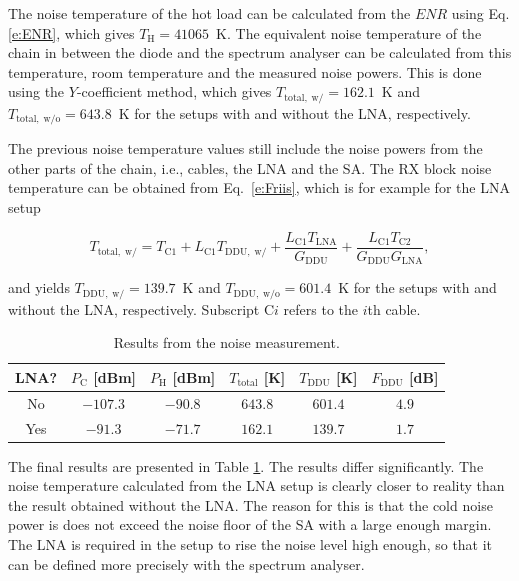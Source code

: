 \documentclass[a4paper, 12pt]{article}
\begin{document}
The noise temperature of the hot load can be calculated from the $\mathit{ENR}$ using Eq. \ref{e:ENR}, which 
gives $T_\mathrm{H} = 41065$~K. The equivalent noise temperature of the chain in between the diode and 
the spectrum analyser can be calculated from this temperature, room temperature and the measured 
noise powers. This is done using the $Y$-coefficient method, which gives $T_{\mathrm{total,\;w/}} = 162.1$~K 
and $T_{\mathrm{total,\;w/o}} = 643.8$~K for the setups with and without the LNA, respectively.

The previous noise temperature values still include the noise powers from the other parts of the 
chain, i.e., cables, the LNA and the SA. The RX block noise temperature can be obtained from Eq.~\ref{e:Friis},
which is for example for the LNA setup

\begin{equation}
T_\mathrm{total,\;w/} = T_\mathrm{C1} + L_\mathrm{C1} T_\mathrm{DDU,\;w/} + \frac{L_\mathrm{C1} T_\mathrm{LNA}}{G_\mathrm{DDU}} + \frac{L_\mathrm{C1} T_\mathrm{C2}}{G_\mathrm{DDU} G_\mathrm{LNA}},
\end{equation}

\noindent
and yields $T_{\mathrm{DDU,\;w/}} = 139.7$~K and $T_{\mathrm{DDU,\;w/o}} = 601.4$~K for the setups 
with and without the LNA, respectively. Subscript $\mathrm{C}i$ refers to the $i$th cable.

\begin{table}[!h]
	\begin{center}
	\caption{Results from the noise measurement.}
	\label{t:noise}
	\renewcommand*{\arraystretch}{1.2}
	\begin{tabular}{cccccc}
	LNA? 			& $P_\mathrm{C}$ [dBm] 		& $P_\mathrm{H}$ [dBm]	& $T_\mathrm{total}$ [K] 	& $T_\mathrm{DDU}$ [K] 	& $F_\mathrm{DDU}$ [dB] \\
	\hline
	No				& $-107.3$					& $-90.8$				& $643.8$ 							& $601.4$ 						& $4.9$\\
	Yes				& $-91.3$					& $-71.7$				& $162.1$ 							& $139.7$ 						& $1.7$ 	
	\end{tabular}
	\end{center}
	\vspace*{-12pt}
\end{table}


The final results are presented in Table \ref{t:noise}. The results differ significantly. The noise 
temperature calculated from the LNA setup is clearly closer to reality than the result obtained without 
the LNA. The reason for this is that the cold noise power is does not exceed the noise floor of the SA 
with a large enough margin. The LNA is required in the setup to rise the noise level high enough, so 
that it can be defined more precisely with the spectrum analyser.
\end{document}
